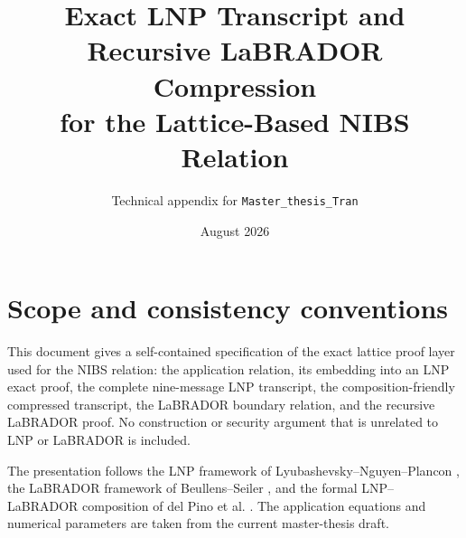 \documentclass[11pt,a4paper]{article}
\title{Exact LNP Transcript and Recursive LaBRADOR Compression\\
for the Lattice-Based NIBS Relation}
\author{Technical appendix for \texttt{Master\_thesis\_Tran}}
\date{August 2026}
\begin{document}
\maketitle
\tableofcontents
\newpage

\section{Scope and consistency conventions}

This document gives a self-contained specification of the exact lattice proof
layer used for the NIBS relation: the application relation, its embedding into
an LNP exact proof, the complete nine-message LNP transcript, the
composition-friendly compressed transcript, the LaBRADOR boundary relation,
and the recursive LaBRADOR proof.  No construction or security argument that
is unrelated to LNP or LaBRADOR is included.

The presentation follows the LNP framework of Lyubashevsky--Nguyen--Plancon
\cite{LNP22}, the LaBRADOR framework of Beullens--Seiler \cite{BS23}, and the
formal LNP--LaBRADOR composition of del Pino et al. \cite{DPKNRT25}.  The
application equations and numerical parameters are taken from the current
master-thesis draft.
\end{document}
